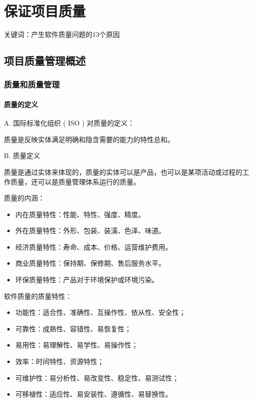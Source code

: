 \chapter{保证项目质量}
关键词：产生软件质量问题的13个原因
\section{项目质量管理概述}
\subsection{质量和质量管理}
\subsubsection{质量的定义}
A. 国际标准化组织 ( ISO ) 对质量的定义：
\par 质量是反映实体满足明确和隐含需要的能力的特性总和。
\par B. 质量定义
\par 质量是通过实体来体现的，质量的实体可以是产品，也可以是某项活动或过程的工作质量，还可以是质量管理体系运行的质量。
\par 质量的内涵：
\begin{itemize}
	\item 内在质量特性：性能、特性、强度、精度。
	\item 外在质量特性：外形、包装、装潢、色泽、味道。
	\item 经济质量特性：寿命、成本、价格、运营维护费用。
	\item 商业质量特性：保持期、保修期、售后服务水平。
	\item 环保质量特性：产品对于环境保护或环境污染。
\end{itemize}
\par 软件质量的质量特性：
\begin{itemize}
	\item 功能性：适合性、准确性、互操作性、依从性、安全性；
	\item 可靠性：成熟性、容错性、易恢复性；
	\item 易用性：易理解性、易学性、易操作性；
	\item 效率：时间特性、资源特性；
	\item 可维护性：易分析性、易改变性、稳定性、易测试性；
	\item 可移植性：适应性、易安装性、遵循性、易替换性。
\end{itemize}
